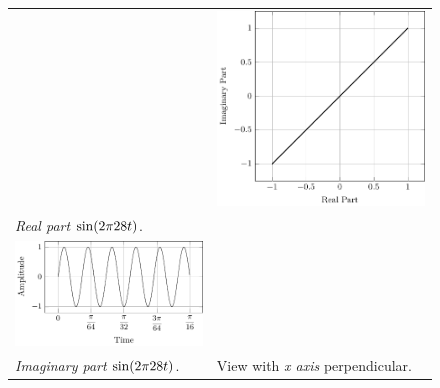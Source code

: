 \documentclass[../../course]{subfiles}
\begin{document}
\begin{figure} [H]
\begin{NiceTabularX} {\textwidth} {
            *{2}{>{\centering\arraybackslash}X}
        }
        &

         {
             {
                \includegraphics[height = \textheight] {tikzpics/plotFrontViewComplexA.pdf}
            }
        }

        \\

         {\emph{Real part} $\sin(2 \pi 28 t)$.}
        \label{plt:realCmplxA}

        &
        \\

         {
             {
                \includegraphics[height = \textheight] {tikzpics/plotShortX1.pdf}
            }
        }

        &
        \\

         {\emph{Imaginary part} $\sin(2 \pi 28 t)$.}
        \label{plt:imagCmplxA}

        &

         {View with \emph{x axis} perpendicular.}
        \label{plt:frontViewCmplxA}

        \\

    \end{NiceTabularX}

\end{figure}
\end{document}

